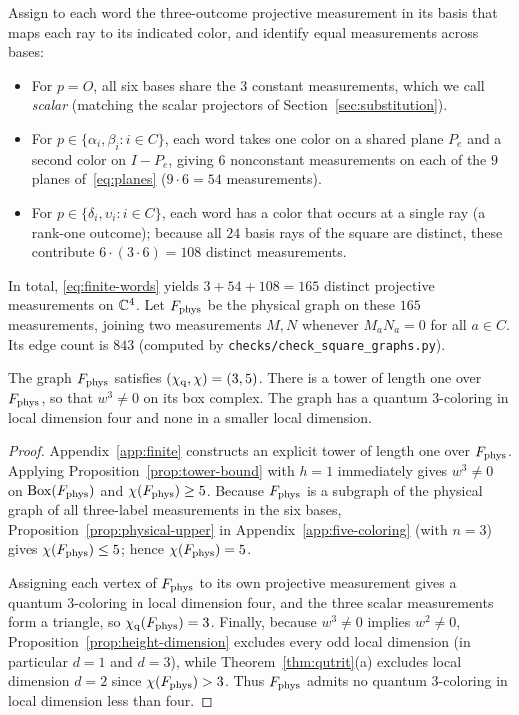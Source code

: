 Assign to each word the three-outcome projective measurement in its basis that maps each ray to its indicated color, and identify equal measurements across bases:
\begin{itemize}
\item For $p=O$, all six bases share the $3$ constant measurements, which we call \emph{scalar} (matching the scalar projectors of Section~\ref{sec:substitution}).
\item For $p\in\{\alpha_i,\beta_i:i\in C\}$, each word takes one color on a shared plane $P_e$ and a second color on $I-P_e$, giving $6$ nonconstant measurements on each of the $9$ planes of~\eqref{eq:planes} ($9\cdot6=54$ measurements).
\item For $p\in\{\delta_i,\upsilon_i:i\in C\}$, each word has a color that occurs at a single ray (a rank-one outcome); because all $24$ basis rays of the square are distinct, these contribute $6\cdot(3\cdot6)=108$ distinct measurements.
\end{itemize}
In total, \eqref{eq:finite-words} yields $3+54+108=165$ distinct projective measurements on $\mathbb C^4$. Let $F_{\rm phys}$ be the physical graph on these $165$ measurements, joining two measurements $M,N$ whenever $M_aN_a=0$ for all $a\in C$. Its edge count is $843$ (computed by \texttt{checks/check\_square\_graphs.py}).

\begin{theorem}\label{thm:finite-square}
The graph $F_{\rm phys}$ satisfies $(\chi_{\mathrm q},\chi)=(3,5)$. There is a tower of length one over $F_{\rm phys}$, so that $w^3\ne0$ on its box complex. The graph has a quantum $3$-coloring in local dimension four and none in a smaller local dimension.
\end{theorem}
\begin{proof}
Appendix~\ref{app:finite} constructs an explicit tower of length one over $F_{\rm phys}$. Applying Proposition~\ref{prop:tower-bound} with $h=1$ immediately gives $w^3\ne0$ on $\operatorname{Box}(F_{\rm phys})$ and $\chi(F_{\rm phys})\ge5$. Because $F_{\rm phys}$ is a subgraph of the physical graph of all three-label measurements in the six bases, Proposition~\ref{prop:physical-upper} in Appendix~\ref{app:five-coloring} (with $n=3$) gives $\chi(F_{\rm phys})\le5$; hence $\chi(F_{\rm phys})=5$.

Assigning each vertex of $F_{\rm phys}$ to its own projective measurement gives a quantum $3$-coloring in local dimension four, and the three scalar measurements form a triangle, so $\chi_{\mathrm q}(F_{\rm phys})=3$. Finally, because $w^3\ne0$ implies $w^2\ne0$, Proposition~\ref{prop:height-dimension} excludes every odd local dimension (in particular $d=1$ and $d=3$), while Theorem~\ref{thm:qutrit}(a) excludes local dimension $d=2$ since $\chi(F_{\rm phys})>3$. Thus $F_{\rm phys}$ admits no quantum $3$-coloring in local dimension less than four.
\end{proof}

